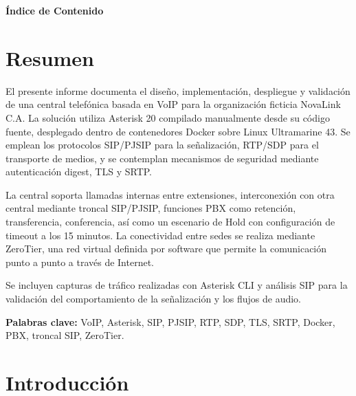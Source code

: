 \documentclass[12pt,a4paper]{article}
\begin{document}
\newpage
\thispagestyle{empty}
\begin{center}
    {\Large\bfseries Índice de Contenido}
\end{center}
\vspace{0.3cm}
{
\footnotesize
\renewcommand{\contentsname}{}
\setlength{\parskip}{0pt}
\setlength{\parindent}{0pt}
\tableofcontents
}
\vfill
\thispagestyle{fancy}
\newpage

\section{Resumen}

El presente informe documenta el diseño, implementación, despliegue y validación de una central telefónica basada en VoIP para la organización ficticia NovaLink C.A. La solución utiliza Asterisk 20 compilado manualmente desde su código fuente, desplegado dentro de contenedores Docker sobre Linux Ultramarine 43. Se emplean los protocolos SIP/PJSIP para la señalización, RTP/SDP para el transporte de medios, y se contemplan mecanismos de seguridad mediante autenticación digest, TLS y SRTP.

La central soporta llamadas internas entre extensiones, interconexión con otra central mediante troncal SIP/PJSIP, funciones PBX como retención, transferencia, conferencia, así como un escenario de Hold con configuración de timeout a los 15 minutos. La conectividad entre sedes se realiza mediante ZeroTier, una red virtual definida por software que permite la comunicación punto a punto a través de Internet.

Se incluyen capturas de tráfico realizadas con Asterisk CLI y análisis SIP para la validación del comportamiento de la señalización y los flujos de audio.

\textbf{Palabras clave:} VoIP, Asterisk, SIP, PJSIP, RTP, SDP, TLS, SRTP, Docker, PBX, troncal SIP, ZeroTier.

\section{Introducción}
\end{document}

